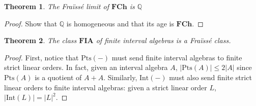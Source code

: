 \documentclass[11pt %
              ]{article}
\newcommand{\Q}{\mathbb{Q}}
\newcommand{\finslo}{\textbf{FCh}}
\newcommand{\finaia}{\textbf{FIA}}
\newcommand{\inter}[1][-]{\text{Int}\left(#1\right)}
\newcommand{\points}[1][-]{\text{Pts}\left(#1\right)}
\theoremstyle{plain}
\newtheorem{thm}{Theorem}%
\theoremstyle{definition}
\theoremstyle{remark}
\begin{document}
\begin{thm}
  The Fraïssé limit of $\finslo$ is $\Q$
\end{thm}
\begin{proof}
  Show that $\Q$ is homogeneous and that its age is $\finslo$.
\end{proof}

\begin{thm}
  The class $\finaia$ of finite interval algebras is a Fraïssé class.
\end{thm}
\begin{proof}
  First, notice that $\points$ must send finite interval algebras to finite strict linear orders.
  In fact, given an interval algebra $A$, $|\points[A]| \leq 2|A|$ since
  $\points[A]$ is a quotient of $A + A$. Similarly, $\inter$ must also send finite strict linear
  orders to finite interval algebras: given a strict linear order $L$, $|\inter[L]| = |L|^2$.


\end{proof}
\end{document}
